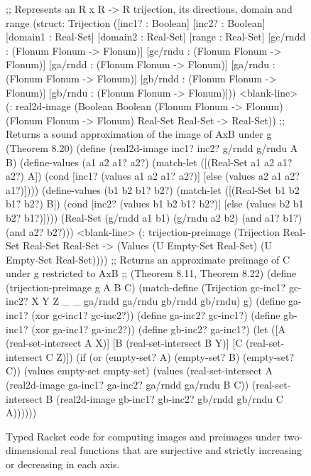 \begin{figure}[p!]\centering
\begin{schemedisplay}
;; Represents an R x R -> R trijection, its directions, domain and range
(struct: Trijection
 ([inc1? : Boolean] [inc2? : Boolean]
  [domain1 : Real-Set] [domain2 : Real-Set] [range : Real-Set]
  [gc/rndd : (Flonum Flonum -> Flonum)] [gc/rndu : (Flonum Flonum -> Flonum)]
  [ga/rndd : (Flonum Flonum -> Flonum)] [ga/rndu : (Flonum Flonum -> Flonum)]
  [gb/rndd : (Flonum Flonum -> Flonum)] [gb/rndu : (Flonum Flonum -> Flonum)]))
<blank-line>
(: real2d-image (Boolean Boolean
                 (Flonum Flonum -> Flonum)
                 (Flonum Flonum -> Flonum)
                 Real-Set Real-Set -> Real-Set))
;; Returns a sound approximation of the image of AxB under g (Theorem 8.20)
(define (real2d-image inc1? inc2? g/rndd g/rndu A B)
  (define-values (a1 a2 a1? a2?)
    (match-let ([(Real-Set a1 a2 a1? a2?)  A])
      (cond [inc1?  (values a1 a2 a1? a2?)]
            [else   (values a2 a1 a2? a1?)])))
  (define-values (b1 b2 b1? b2?)
    (match-let ([(Real-Set b1 b2 b1? b2?)  B])
      (cond [inc2?  (values b1 b2 b1? b2?)]
            [else   (values b2 b1 b2? b1?)])))
  (Real-Set (g/rndd a1 b1) (g/rndu a2 b2) (and a1? b1?) (and a2? b2?)))
<blank-line>
(: trijection-preimage (Trijection Real-Set Real-Set Real-Set
                         -> (Values (U Empty-Set Real-Set)
                                    (U Empty-Set Real-Set))))
;; Returns an approximate preimage of C under g restricted to AxB
;; (Theorem 8.11, Theorem 8.22)
(define (trijection-preimage g A B C)
  (match-define (Trijection gc-inc1? gc-inc2? X Y Z
                            _ _ ga/rndd ga/rndu gb/rndd gb/rndu) g)
  (define ga-inc1? (xor gc-inc1? gc-inc2?))
  (define ga-inc2? gc-inc1?)
  (define gb-inc1? (xor ga-inc1? ga-inc2?))
  (define gb-inc2? ga-inc1?)
  (let ([A  (real-set-intersect A X)]
        [B  (real-set-intersect B Y)]
        [C  (real-set-intersect C Z)])
    (if (or (empty-set? A) (empty-set? B) (empty-set? C))
        (values empty-set empty-set)
        (values (real-set-intersect
                 A (real2d-image ga-inc1? ga-inc2? ga/rndd ga/rndu B C))
                (real-set-intersect
                 B (real2d-image gb-inc1? gb-inc2? gb/rndd gb/rndu C A))))))
\end{schemedisplay}
\bottomhrule
\caption[Computing images and preimages under two-dimensional real functions]{Typed Racket code for computing images and preimages under two-dimensional real functions that are surjective and strictly increasing or decreasing in each axis.}
\label{fig:trijection-implementation}
\end{figure}

